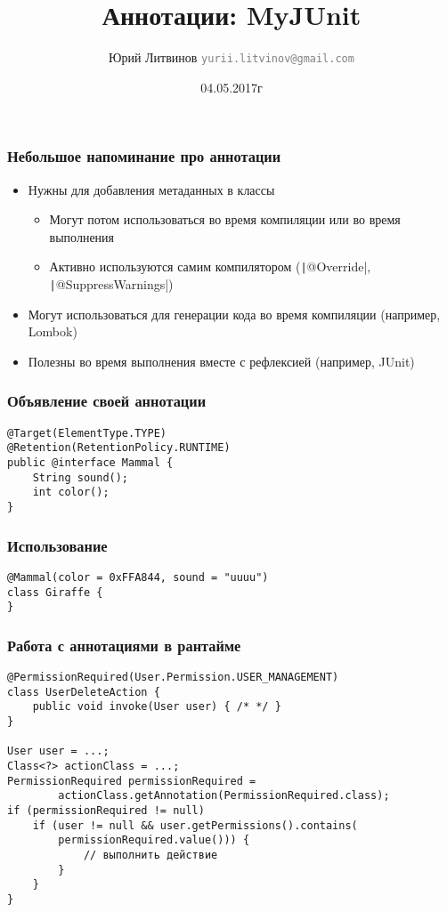\documentclass[xetex,mathserif,serif]{beamer}
\title{Аннотации: MyJUnit}
\author[Юрий Литвинов]{Юрий Литвинов \newline \textcolor{gray}{\small\texttt{yurii.litvinov@gmail.com}}}
\date{04.05.2017г}
\begin{document}
	
	\frame{\titlepage}
	
	\begin{frame}
		\frametitle{Небольшое напоминание про аннотации}
		\begin{itemize}
			\item Нужны для добавления метаданных в классы
			\begin{itemize}
				\item Могут потом использоваться во время компиляции или во время выполнения
				\item Активно используются самим компилятором (\texttt|@Override|, \texttt|@SuppressWarnings|)
			\end{itemize}
			\item Могут использоваться для генерации кода во время компиляции (например, Lombok)
			\item Полезны во время выполнения вместе с рефлексией (например, JUnit)
		\end{itemize}
	\end{frame}

	\begin{frame}[fragile]
		\frametitle{Объявление своей аннотации}
		\begin{verbatim}
@Target(ElementType.TYPE)
@Retention(RetentionPolicy.RUNTIME)
public @interface Mammal {
    String sound();
    int color();
}
		\end{verbatim}
\end{frame}

	\begin{frame}[fragile]
		\frametitle{Использование}
		\begin{verbatim}
@Mammal(color = 0xFFA844, sound = "uuuu")
class Giraffe {
}
		\end{verbatim}
\end{frame}

	\begin{frame}[fragile]
		\frametitle{Работа с аннотациями в рантайме}
		\begin{verbatim}
@PermissionRequired(User.Permission.USER_MANAGEMENT)
class UserDeleteAction {
    public void invoke(User user) { /* */ }
}

User user = ...;
Class<?> actionClass = ...;
PermissionRequired permissionRequired =
        actionClass.getAnnotation(PermissionRequired.class);
if (permissionRequired != null)
    if (user != null && user.getPermissions().contains(
        permissionRequired.value())) {
            // выполнить действие
        }
    }
}
		\end{verbatim}
\end{frame}
\end{document}
